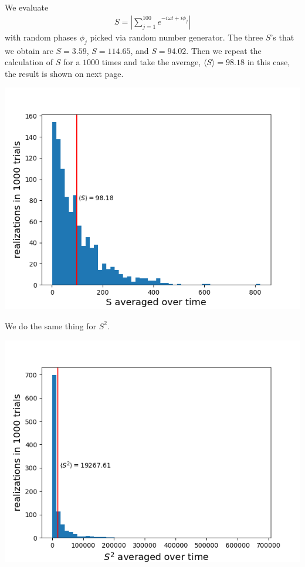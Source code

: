 \documentclass[11pt, oneside]{book}
\theoremstyle{break}
\theoremstyle{break}
\begin{document}
\chapter{}
We evaluate 
\begin{align*}
S = \left|\sum_{j=1}^{100} e^{-i\omega t+ i\phi_j} \right|
\end{align*}
with random phases $\phi_j$ picked via random number generator. The three $S$'s that we obtain are $S = 3.59$, $S=114.65$, and $S=94.02$. Then we repeat the calculation of $S$ for a $1000$ times and take the average, $\langle S\rangle = 98.18$ in this case, the result is shown on next page.
\newpage
\begin{center}
\includegraphics[scale=0.65]{542HW9/P2}
\end{center}
We do the same thing for $S^2$.
\begin{center}
\includegraphics[scale=0.65]{542HW9/P2S2}
\end{center}
\end{document}
